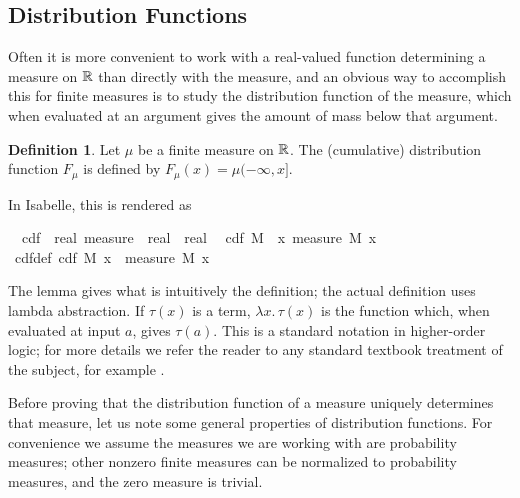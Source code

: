 \documentclass[leqno]{article}
\theoremstyle{definition}
\newtheorem{definition}[theorem]{Definition}
\begin{document}
\subsection{Distribution Functions} \label{sec:cdf}

Often it is more convenient to work with a real-valued function determining a measure on $\mathbb{R}$ than directly with the measure, and an obvious way to accomplish this for finite measures is to study the distribution function of the measure, which when evaluated at an argument gives the amount of mass below that argument.

\begin{definition}
Let $\mu$ be a finite measure on $\mathbb{R}$. The (cumulative) distribution function $F_\mu$ is defined by $F_\mu(x) = \mu (-\infty, x]$.
\end{definition}

In Isabelle, this is rendered as

\medskip

\begin{isabellebody}
\isamarkupfalse%
\isanewline
\ \ cdf\ {\isacharcolon}{\isacharcolon}\ {\isachardoublequoteopen}real\ measure\ {\isasymRightarrow}\ real\ {\isasymRightarrow}\ real{\isachardoublequoteclose}\isanewline
{}\isanewline
\ \ {\isachardoublequoteopen}cdf\ M\ {\isasymequiv}\ {\isasymlambda}x{\isachardot}\ measure\ M\ {\isacharbraceleft}{\isachardot}{\isachardot}x{\isacharbraceright}{\isachardoublequoteclose}\isanewline
\isanewline
{}\isamarkupfalse%
\ cdf{\isacharunderscore}def{}{\isacharcolon}\ {\isachardoublequoteopen}cdf\ M\ x\ {\isacharequal}\ measure\ M\ {\isacharbraceleft}{\isachardot}{\isachardot}x{\isacharbraceright}{\isachardoublequoteclose}%
\end{isabellebody}

\medskip

The lemma gives what is intuitively the definition; the actual definition uses lambda abstraction. If $\tau(x)$ is a term, $\lambda x. \, \tau(x)$ is the function which, when evaluated at input $a$, gives $\tau(a)$. This is a standard notation in higher-order logic; for more details we refer the reader to any standard textbook treatment of the subject, for example \cite{andrews}.

Before proving that the distribution function of a measure uniquely determines that measure, let us note some general properties of distribution functions. For convenience we assume the measures we are working with are probability measures; other nonzero finite measures can be normalized to probability measures, and the zero measure is trivial.
\end{document}
